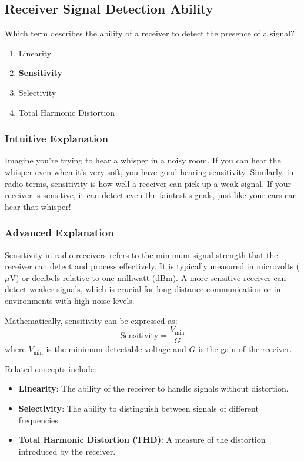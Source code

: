 \subsection{Receiver Signal Detection Ability}
\label{T7A01}

\begin{tcolorbox}[colback=gray!10!white,colframe=black!75!black,title=T7A01]
Which term describes the ability of a receiver to detect the presence of a signal?
\begin{enumerate}[label=\Alph*]
    \item Linearity
    \item \textbf{Sensitivity}
    \item Selectivity
    \item Total Harmonic Distortion
\end{enumerate}
\end{tcolorbox}

\subsubsection{Intuitive Explanation}
Imagine you're trying to hear a whisper in a noisy room. If you can hear the whisper even when it's very soft, you have good hearing sensitivity. Similarly, in radio terms, sensitivity is how well a receiver can pick up a weak signal. If your receiver is sensitive, it can detect even the faintest signals, just like your ears can hear that whisper!

\subsubsection{Advanced Explanation}
Sensitivity in radio receivers refers to the minimum signal strength that the receiver can detect and process effectively. It is typically measured in microvolts ($\mu$V) or decibels relative to one milliwatt (dBm). A more sensitive receiver can detect weaker signals, which is crucial for long-distance communication or in environments with high noise levels.

Mathematically, sensitivity can be expressed as:
\[
\text{Sensitivity} = \frac{V_{\text{min}}}{G}
\]
where \( V_{\text{min}} \) is the minimum detectable voltage and \( G \) is the gain of the receiver.

Related concepts include:
\begin{itemize}
    \item \textbf{Linearity}: The ability of the receiver to handle signals without distortion.
    \item \textbf{Selectivity}: The ability to distinguish between signals of different frequencies.
    \item \textbf{Total Harmonic Distortion (THD)}: A measure of the distortion introduced by the receiver.
\end{itemize}

